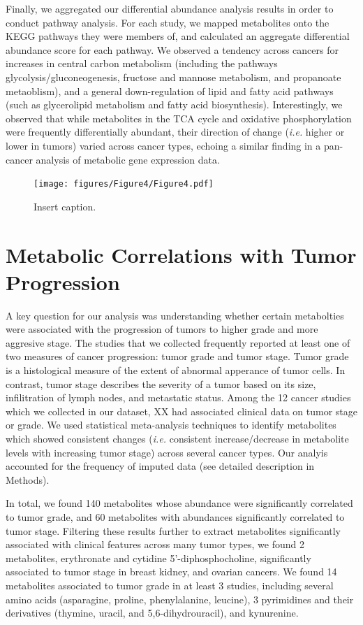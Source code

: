 \documentclass[10pt]{article}
\begin{document}
Finally, we aggregated our differential abundance analysis results in order to conduct pathway analysis. For each study, we mapped metabolites onto the KEGG pathways they were members of, and calculated an aggregate differential abundance score for each pathway. We observed a tendency across cancers for increases in central carbon metabolism (including the pathways glycolysis/gluconeogenesis, fructose and mannose metabolism, and propanoate metaoblism), and a general down-regulation of lipid and fatty acid pathways (such as glycerolipid metabolism and fatty acid biosynthesis). Interestingly, we observed that while metabolites in the TCA cycle and oxidative phosphorylation were frequently differentially abundant, their direction of change (\textit{i.e.} higher or lower in tumors) varied across cancer types, echoing a similar finding in a pan-cancer analysis of metabolic gene expression data.

\begin{figure}[ht!]
  \centering
     \texttt{[image: figures/Figure4/Figure4.pdf]}
  \caption{Insert caption. }
     \label{fig:Fig4}
\end{figure}


\section{Metabolic Correlations with Tumor Progression}
A key question for our analysis was understanding whether certain metabolties were associated with the progression of tumors to higher grade and more aggresive stage. The studies that we collected frequently reported at least one of two measures of cancer progression: tumor grade and tumor stage. Tumor grade is a histological measure of the extent of abnormal apperance of tumor cells. In contrast, tumor stage describes the severity of a tumor based on its size, infilitration of lymph nodes, and metastatic status. Among the 12 cancer studies which we collected in our dataset, XX had associated clinical data on tumor stage or grade. We used statistical meta-analysis techniques to identify metabolites which showed consistent changes (\textit{i.e.} consistent increase/decrease in metabolite levels with increasing tumor stage) across several cancer types. Our analyis accounted for the frequency of imputed data (see detailed description in Methods).

In total, we found 140 metabolites whose abundance were significantly correlated to tumor grade, and 60 metabolites with abundances significantly correlated to tumor stage. Filtering these results further to extract metabolites significantly associated with clinical features across many tumor types, we found 2 metabolites, erythronate and cytidine 5'-diphosphocholine, significantly associated to tumor stage in breast kidney, and ovarian cancers. We found 14 metabolites associated to tumor grade in at least 3 studies, including several amino acids (asparagine, proline, phenylalanine, leucine), 3 pyrimidines and their derivatives (thymine, uracil, and 5,6-dihydrouracil), and kynurenine. 
\end{document}
